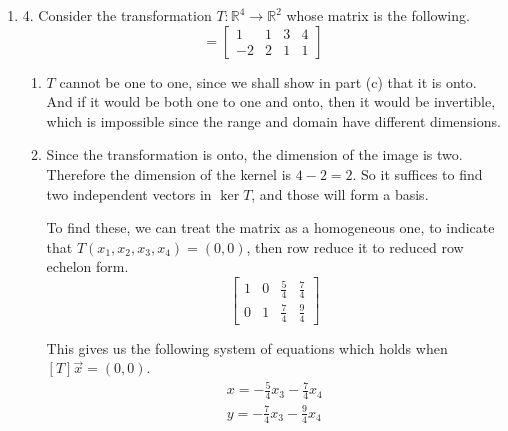 \documentclass{article}
\newenvironment{answers}{ %
	\begin{enumerate}
		\setlength{\itemsep}{\bigskipamount}
}{\end{enumerate}}
\newcommand{\R}{\mathbb{R}}
\begin{document}
\begin{answers}
\begin{enumerate}
				To find two such vectors, we can apply \(T\) to two vectors in the domain, then verify that they are indeed independent. We shall choose the vectors \((1, 0, 0)\) and \((0, 0, 1)\). Applying \(T\) to these gives us a basis \(\{(1, 2), (0, -1)\}\), which is indeed independent.
		\end{enumerate}

	\item[4.]
		Consider the transformation \(T:\R^4 \to \R^2\) whose matrix is the following.
		\begin{equation*}
			[T] = \left[ \begin{matrix}
					1  & 1 & 3 & 4 \\
					-2 & 2 & 1 & 1
				\end{matrix} \right]
		\end{equation*}
		\begin{enumerate}
			\item
				\(T\) cannot be one to one, since we shall show in part (c) that it is onto. And if it would be both one to one and onto, then it would be invertible, which is impossible since the range and domain have different dimensions.

			\item
				Since the transformation is onto, the dimension of the image is two. Therefore the dimension of the kernel is \(4-2=2\). So it suffices to find two independent vectors in \(\ker T\), and those will form a basis.

				To find these, we can treat the matrix as a homogeneous one, to indicate that \(T(x_1, x_2, x_3, x_4) = (0, 0)\), then row reduce it to reduced row echelon form.
				\begin{equation*}
					\left[ \begin{matrix}
							1 & 0 & \frac{5}{4} & \frac{7}{4} \\[6pt]
							0 & 1 & \frac{7}{4} & \frac{9}{4}
						\end{matrix} \right]
				\end{equation*}

				This gives us the following system of equations which holds when \([T]\vec{x} = (0,0)\).
				\begin{gather*}
					x = -\frac{5}{4}x_3 - \frac{7}{4}x_4 \\
					y = -\frac{7}{4}x_3 - \frac{9}{4}x_4
				\end{gather*}


\end{enumerate}
\end{answers}
\end{document}
